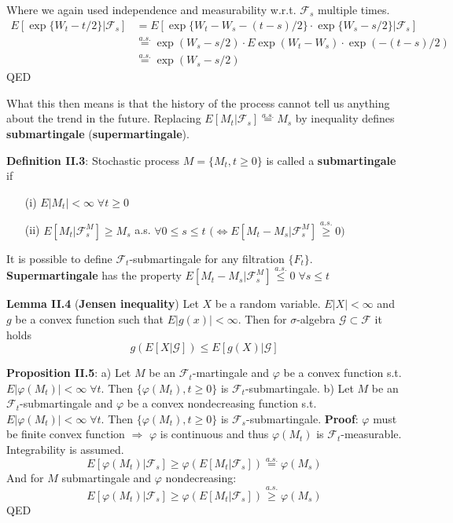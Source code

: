 \documentclass[english]{article}
\newcommand{\note}[1]{\noindent\textbf{#1}}
\newcommand{\F}{\mathcal F}
\newcommand{\as}[1]{\stackrel {a.s.}{#1}}
\begin{document}
Where we again used independence and measurability w.r.t. $\F_s$ multiple times.
\begin{align*} E[\exp\{W_t - t/2\} | \F_s] & = E[\exp\{W_t - W_s - (t-s)/2 \} \cdot \exp\{W_s - s/2\} | \F_s] \\
&  \as = \exp(W_s - s/2) \cdot E \exp (W_t - W_s) \cdot \exp (-(t-s)/2) \\
& \as =  \exp(W_s - s/2)
\end{align*}
QED \newline

What this then means is that the history of the process cannot tell us anything about the trend in the future. \newline
Replacing $E[M_t | \F_s] \as = M_s$ by inequality defines \textbf{submartingale} (\textbf{supermartingale}). \newline

\note{Definition II.3}: Stochastic process $M = \{M_t, t\geq 0\}$ is called a \textbf{submartingale} if \begin{enumerate}
\item[(i)] $E|M_t| < \infty \; \forall t\geq 0$
\item[(ii)] $E[M_t | \F^M_s] \geq M_s$ a.s. $\forall 0\leq s \leq t$  $\big(\iff E[M_t - M_s |\F^M_s] \as \geq 0 \big)$
\end{enumerate}
It is possible to define $\F_t$-submartingale for any filtration $\{F_t\}$. \newline
\textbf{Supermartingale} has the property $E[M_t - M_s | \F^M_s] \as \leq 0 \;\forall s\leq t$ \newline

\note{Lemma II.4} (\textbf{Jensen inequality}) Let $X$ be a random variable. $E|X| < \infty$ and $g$ be a convex function such that $E|g(x)|<\infty$. Then for $\sigma$-algebra $\mathcal G\subset \F$ it holds
$$g(E[X|\mathcal G]) \leq E[g(X)| \mathcal G]$$ \newline

\note{Proposition II.5}: a) Let $M$ be an $\F_t$-martingale and $\varphi$ be a convex function s.t. $E|\varphi(M_t)| <\infty \; \forall t$. Then $\{\varphi(M_t), t\geq 0 \}$ is $\F_t$-submartingale. \newline
b) Let $M$ be an $\F_t$-submartingale and $\varphi$ be a convex nondecreasing function s.t. $E|\varphi (M_t)| < \infty \; \forall t$. Then $\{\varphi(M_t), t\geq 0\}$ is $\F_s$-submartingale. \newline
\note{Proof}: $\varphi$ must be finite convex function $\Rightarrow$ $\varphi$ is continuous and thus $\varphi(M_t)$ is $\F_t$-measurable. Integrability is assumed.
$$E[\varphi(M_t) | \F_s] \geq  \varphi(E[M_t |\F_s]) \as = \varphi(M_s)$$
And for $M$ submartingale and $\varphi$ nondecreasing:
$$E[\varphi(M_t) | \F_s] \geq  \varphi(E[M_t |\F_s]) \as \geq \varphi(M_s)$$
QED \newline
\end{document}

